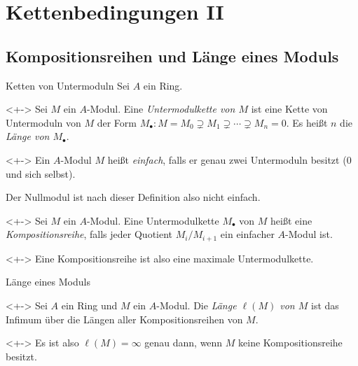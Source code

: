 \section{Kettenbedingungen II}

\subsection{Kompositionsreihen und Länge eines Moduls}

\begin{frame}{Ketten von Untermoduln}
	Sei \(A\) ein Ring.
	\begin{definition}<+->
		Sei \(M\) ein \(A\)-Modul. Eine \emph{Untermodulkette von
		\(M\)} ist eine Kette von Untermoduln von \(M\) der Form
		\(M_\bullet\colon M = M_0 \supsetneq M_1 \supsetneq \dotsb \supsetneq M_n = 0\).
		Es heißt \(n\) die \emph{Länge von \(M_\bullet\)}.
	\end{definition}
	\begin{definition}<+->
		Ein \(A\)-Modul \(M\) heißt \emph{einfach}, falls er genau zwei
		Untermoduln besitzt (\(0\) und sich selbst).
	\end{definition}
	Der Nullmodul ist nach dieser Definition also nicht einfach.
	\begin{definition}<+->
		Sei \(M\) ein \(A\)-Modul. Eine Untermodulkette \(M_\bullet\) von \(M\)
		heißt eine \emph{Kompositionsreihe}, falls jeder Quotient
		\(M_i/M_{i + 1}\) ein einfacher \(A\)-Modul ist.
	\end{definition}
	\begin{visibleenv}<+->
		Eine Kompositionsreihe ist also eine maximale Untermodulkette.
	\end{visibleenv}
\end{frame}

\begin{frame}{Länge eines Moduls}
	\begin{definition}<+->
		Sei \(A\) ein Ring und \(M\) ein \(A\)-Modul.
		Die \emph{Länge \(\ell(M)\) von \(M\)} ist das Infimum über die Längen aller
		Kompositionsreihen von \(M\).
	\end{definition}
	\begin{visibleenv}<+->
		Es ist also \(\ell(M) = \infty\) genau dann, wenn \(M\) keine Kompositionsreihe
		besitzt.
	\end{visibleenv}
\end{frame}

